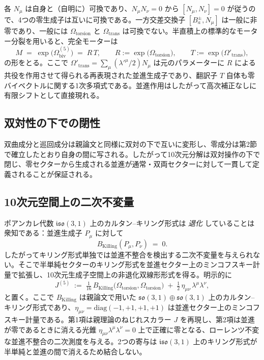 \documentclass[11pt,a4paper]{article}
\begin{document}
各 $N_{\mu}$ は自身と（自明に）可換であり、$N_{\mu}N_{\nu}=0$ から $[N_{\mu},N_{\nu}]=0$ が従うので、4つの零生成子は互いに可換である。一方交差交換子 $[B_{a}^{\pm},N_{\mu}]$ は一般に非零であり、一般には $\Omega_{\text{torsion}}$ と $\Omega_{\text{trans}}$ は可換でない。半直積上の標準的なモーター分裂を用いると、完全モーターは
\begin{equation}
M \;=\; \exp\!\bigl(\Omega_{\text{biv}}^{(5)}\bigr) \;=\; R\,T,
\qquad
R := \exp\!\bigl(\Omega_{\text{torsion}}\bigr),\qquad
T := \exp\!\bigl(\Omega'_{\text{trans}}\bigr),
\end{equation}
の形をとる。ここで $\Omega'_{\text{trans}}=\sum_{\mu}(\lambda'^{\mu}/2)N_{\mu}$ は元のパラメーターに $R$ による共役を作用させて得られる再表現された並進生成子であり、翻訳子 $T$ 自体も零バイベクトルに関する1次多項式である。並進作用はしたがって高次補正なしに有限シフトとして直接現れる。

\subsection{双対性の下での閉性}

双曲成分と巡回成分は親論文と同様に双対の下で互いに変形し、零成分は第2節で確立したとおり自身の間に写される。したがって10次元分解は双対操作の下で閉じ、零セクターから生成される並進が通常・双両セクターに対して一貫して定義されることが保証される。

\subsection{10次元空間上の二次不変量}

ポアンカレ代数 $\mathfrak{iso}(3,1)$ 上のカルタン--キリング形式は \emph{退化} していることは衆知である：並進生成子 $P_{\mu}$ に対して
\[
B_{\text{Killing}}(P_{\mu},P_{\nu})\;=\;0.
\]
したがってキリング形式単独では並進不整合を検出する二次不変量を与えられない。そこで半単純セクターのキリング形式を並進セクター上のミンコフスキー計量で拡張し、10次元生成子空間上の非退化双線形形式を得る。明示的に
\begin{equation}
\boxed{\;
J^{(5)}
\;:=\;
\tfrac{1}{16}\,B_{\text{Killing}}\!\bigl(\Omega_{\text{torsion}},\Omega_{\text{torsion}}\bigr)
\;+\;
\tfrac{1}{2}\,\eta_{\mu\nu}\,\lambda^{\mu}\lambda^{\nu},
\;}
\label{eq:J5-invariant}
\end{equation}
と置く。ここで $B_{\text{Killing}}$ は親論文で用いた $\mathfrak{so}(3,1)\oplus\mathfrak{so}(3,1)$ 上のカルタン--キリング形式であり、$\eta_{\mu\nu}=\mathrm{diag}(-1,+1,+1,+1)$ は並進セクター上のミンコフスキー計量である。第1項は親理論のねじれスカラー $J$ を再現し、第2項は並進が零であるときに消える光錐 $\eta_{\mu\nu}\lambda^{\mu}\lambda^{\nu}=0$ 上で正確に零となる、ローレンツ不変な並進不整合の二次測度を与える。2つの寄与は $\mathfrak{iso}(3,1)$ 上のキリング形式が半単純と並進の間で消えるため結合しない。
\end{document}
